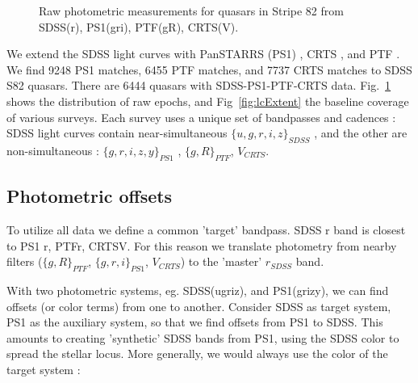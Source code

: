 \documentclass[twocolumn]{aastex62}
\begin{document}
\begin{figure}%
\caption{Raw photometric measurements for quasars in Stripe 82 from SDSS(r),  PS1(gri),  PTF(gR), CRTS(V).}
\label{fig:rawBaselines}
\end{figure} 

\begin{figure*}
\caption{An illustration of survey baseline, sky area covered, and depth. The width of each rectangle corresponds to the extent of light curves available (or simulated) for Stripe 82 quasars for each survey. For SDSS this means DR7; for CRTS DR2, PS1 DR2, PTF DR2, ZTF year 2018, and LSST the full 10-year survey. The lower edge of each rectangle corresponds to the $5\sigma$ limiting magnitude (SDSS r, PS1 r, PTF R, ZTF r, LSST r, CRTS V). The vertical extent corresponds to the total survey area (for SDSS, up to and including DR15).  Note how PS1 and PTF extend the baseline of SDSS by approximately $50\%$, and how inclusion of LSST triples the SDSS baseline. For reference, the area covered by LSST is $25 000$ sq.deg., which corresponds to  $60\%$ of the sky. The whole sky has an area of $4\pi$ steradians (41253 sq.deg.).}
\label{fig:lcExtent}
\end{figure*} 


We extend the SDSS  light curves with PanSTARRS (PS1) \citep{chambers2011,flewelling2018}, CRTS \citep{drake2009}, and PTF \citep{rau2009}. We find 9248 PS1 matches, 6455 PTF matches, and 7737 CRTS matches to SDSS S82 quasars. There are  6444 quasars with SDSS-PS1-PTF-CRTS data.  Fig.~\ref{fig:rawBaselines}  shows the distribution of raw epochs, and Fig~\ref{fig:lcExtent} the  baseline coverage of various surveys.    Each survey uses a unique set of bandpasses and cadences : SDSS light curves contain near-simultaneous $\{u,g,r,i,z\}_{SDSS}$ , and the other are  non-simultaneous : $\{g,r,i,z,y\}_{PS1}$ ,  $\{g,R\}_{PTF}$, $V_{CRTS}$.  

\subsection{Photometric offsets}

To utilize all data we define a common 'target' bandpass. SDSS r band is closest to PS1 r, PTFr, CRTSV. For this reason we translate photometry from nearby filters ($\{g,R\}_{PTF}$, $\{g,r,i\}_{PS1}$, $V_{CRTS}$) to the  'master' $r_{SDSS}$  band.

With two photometric systems, eg. SDSS(ugriz), and PS1(grizy),  we can find offsets (or color terms) from one to another. Consider SDSS as target system,  PS1 as the auxiliary system, so that we find offsets from PS1 to SDSS. This amounts to creating 'synthetic' SDSS bands from PS1, using the SDSS color to spread the stellar locus. More generally, we would always use the color of the target system : 
\end{document}
